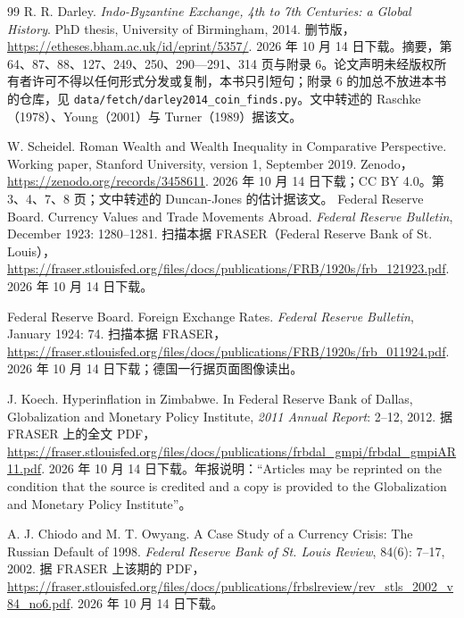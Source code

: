 \begin{thebibliography}{99}
 R. R. Darley. \emph{Indo-Byzantine Exchange, 4th to 7th Centuries: a Global History}. PhD thesis, University of Birmingham, 2014. 删节版，\url{https://etheses.bham.ac.uk/id/eprint/5357/}. 2026 年 10 月 14 日下载。摘要，第 64、87、88、127、249、250、290—291、314 页与附录 6。论文声明未经版权所有者许可不得以任何形式分发或复制，本书只引短句；附录 6 的加总不放进本书的仓库，见 \texttt{data/fetch/darley2014\_coin\_finds.py}。文中转述的 Raschke（1978）、Young（2001）与 Turner（1989）据该文。

 W. Scheidel. Roman Wealth and Wealth Inequality in Comparative Perspective. Working paper, Stanford University, version 1, September 2019. Zenodo，\url{https://zenodo.org/records/3458611}. 2026 年 10 月 14 日下载；CC BY 4.0。第 3、4、7、8 页；文中转述的 Duncan-Jones 的估计据该文。
 Federal Reserve Board. Currency Values and Trade Movements Abroad. \emph{Federal Reserve Bulletin}, December 1923: 1280--1281. 扫描本据 FRASER（Federal Reserve Bank of St. Louis），\url{https://fraser.stlouisfed.org/files/docs/publications/FRB/1920s/frb_121923.pdf}. 2026 年 10 月 14 日下载。

 Federal Reserve Board. Foreign Exchange Rates. \emph{Federal Reserve Bulletin}, January 1924: 74. 扫描本据 FRASER，\url{https://fraser.stlouisfed.org/files/docs/publications/FRB/1920s/frb_011924.pdf}. 2026 年 10 月 14 日下载；德国一行据页面图像读出。

 J. Koech. Hyperinflation in Zimbabwe. In Federal Reserve Bank of Dallas, Globalization and Monetary Policy Institute, \emph{2011 Annual Report}: 2--12, 2012. 据 FRASER 上的全文 PDF，\url{https://fraser.stlouisfed.org/files/docs/publications/frbdal_gmpi/frbdal_gmpiAR11.pdf}. 2026 年 10 月 14 日下载。年报说明：“Articles may be reprinted on the condition that the source is credited and a copy is provided to the Globalization and Monetary Policy Institute”。

 A. J. Chiodo and M. T. Owyang. A Case Study of a Currency Crisis: The Russian Default of 1998. \emph{Federal Reserve Bank of St. Louis Review}, 84(6): 7--17, 2002. 据 FRASER 上该期的 PDF，\url{https://fraser.stlouisfed.org/files/docs/publications/frbslreview/rev_stls_2002_v84_no6.pdf}. 2026 年 10 月 14 日下载。


\end{thebibliography}
